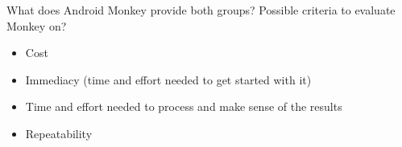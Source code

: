 What does Android Monkey provide both groups?
Possible criteria to evaluate Monkey on?
\begin{itemize}
    \item Cost
    \item Immediacy (time and effort needed to get started with it)
    \item Time and effort needed to process and make sense of the results
    \item Repeatability 
\end{itemize}